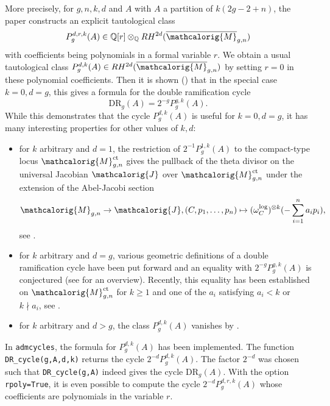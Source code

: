 \documentclass[11pt]{article}
\newcommand{\M}{\ensuremath{\overline{\mathcalorig{M}}}}
\newcommand{\DR}{\mathrm{DR}}
\begin{document}
More precisely, for $g,n,k,d$ and $A$ with $A$ a partition of $k(2g-2+n)$, the paper constructs an explicit tautological class
\[P_g^{d,r,k}(A) \in \mathbb{Q}[r] \otimes_{\mathbb{Q}} RH^{2d}(\M_{g,n})\]
with coefficients being polynomials in a formal variable $r$. We obtain a usual tautological class $P_g^{d,k}(A) \in RH^{2d}(\M_{g,n})$ by setting $r=0$ in these polynomial coefficients. Then it is shown (\cite[Theorem 1]{Janda2016Double-ramifica}) that in the special case $k=0,d=g$, this gives a formula for the double ramification cycle
\[\DR_g(A) = 2^{-g} P_g^{g,k}(A).\]
While this demonstrates that the cycle $P_g^{d,k}(A)$ is useful for $k=0, d=g$, it has many interesting properties for other values of $k,d$:
\begin{itemize}
    \item for $k$ arbitrary and $d=1$, the restriction of $2^{-1} P_g^{1,k}(A)$ to the compact-type locus $\mathcalorig{M}_{g,n}^\textup{ct}$ gives the pullback of the theta divisor on the universal Jacobian $\mathcalorig{J}$ over $\mathcalorig{M}_{g,n}^\textup{ct}$ under the extension of the Abel-Jacobi section
    \[\mathcalorig{M}_{g,n} \to \mathcalorig{J}, (C,p_1, \ldots, p_n) \mapsto (\omega_C^\textup{log})^{\otimes k}(- \sum_{i=1}^n a_i p_i),\]
    see \cite{Hain2013Normal-function, Grushevsky2012The-zero-sectio}.
    \item for $k$ arbitrary and $d=g$, various geometric definitions of a double ramification cycle have been put forward and an equality with $2^{-g} P_g^{g,k}(A)$ is conjectured (see \cite[Section 1.6]{holmesschmitt} for an overview). Recently, this equality has been established on $\mathcalorig{M}_{g,n}^\textup{ct}$ for $k \geq 1$ and one of the $a_i$ satisfying $a_i<k$ or $k \nmid a_i$, see \cite[Corollary 1.2]{holmesschmitt}.
    \item for $k$ arbitrary and $d>g$, the class $P_g^{d,k}(A)$ vanishes by \cite{claderjanda}.
\end{itemize}
In \texttt{admcycles}, the formula for $P_g^{d,k}(A)$ has been implemented. The function \verb|DR_cycle(g,A,d,k)| returns the cycle $2^{-d} P_g^{d,k}(A)$. The factor $2^{-d}$ was chosen such that \verb|DR_cycle(g,A)| indeed gives the cycle $\DR_g(A)$. With the option \texttt{rpoly=True}, it is even possible to compute the cycle $2^{-d} P_g^{d,r,k}(A)$ whose coefficients are polynomials in the variable $r$.
\end{document}

